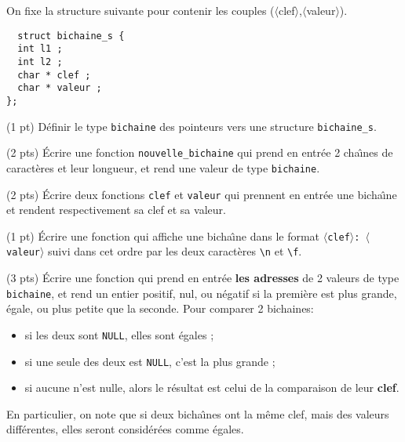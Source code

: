 
On fixe la structure suivante pour contenir les couples
($\langle$clef$\rangle$,$\langle$valeur$\rangle$).
\begin{lstlisting}
  struct bichaine_s {
  int l1 ;
  int l2 ;
  char * clef ;
  char * valeur ;
};
\end{lstlisting}


\question (1 pt) D{\'e}finir le type \texttt{bichaine} des pointeurs vers
une structure \texttt{bichaine\_s}.

\question (2 pts) {\'E}crire une fonction \texttt{nouvelle\_bichaine} qui
prend en entr{\'e}e 2 cha{\^\i}nes de caract{\`e}res et leur longueur, et rend une
valeur de type \texttt{bichaine}.

\question (2 pts) {\'E}crire deux fonctions \texttt{clef} et
\texttt{valeur} qui prennent en entr{\'e}e une bicha{\^\i}ne et rendent
respectivement sa clef et sa valeur.

\question (1 pt) {\'E}crire une fonction qui affiche une bicha{\^\i}ne dans le
format \texttt{$\langle$clef$\rangle$: $\langle$valeur$\rangle$} suivi
dans cet ordre par les deux caract{\`e}res \verb+\n+ et \verb+\f+.

\question (3 pts) {\'E}crire une fonction qui prend en entr{\'e}e
\textbf{les adresses} de 2 valeurs de type \texttt{bichaine}, et rend 
un entier positif, nul, ou n{\'e}gatif si la premi{\`e}re est plus grande,
{\'e}gale, ou plus petite que la seconde. Pour comparer 2 bichaines:
\begin{itemize}
\item si les deux sont \texttt{NULL}, elles sont {\'e}gales ;
\item si une seule des deux est \texttt{NULL}, c'est la plus
  grande ;
\item si aucune n'est nulle, alors le r{\'e}sultat est celui de la
  comparaison de leur \textbf{clef}.
\end{itemize}
En particulier, on note que si deux bicha{\^\i}nes ont la m{\^e}me clef, mais
des valeurs diff{\'e}rentes, elles seront consid{\'e}r{\'e}es comme {\'e}gales.

